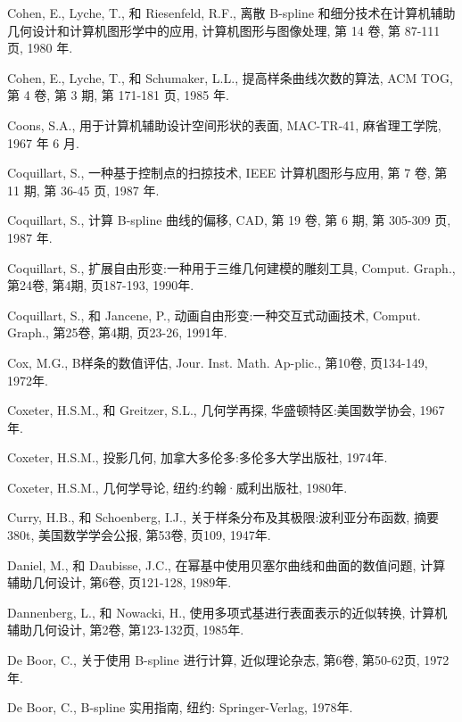 \documentclass[../main.tex]{subfiles}
\begin{document}
\begin{BookBibliography}
 Cohen, E., Lyche, T., 和 Riesenfeld, R.F., 离散 B-spline 和细分技术在计算机辅助几何设计和计算机图形学中的应用, 计算机图形与图像处理, 第 14 卷, 第 87-111 页, 1980 年.

 Cohen, E., Lyche, T., 和 Schumaker, L.L., 提高样条曲线次数的算法, ACM TOG, 第 4 卷, 第 3 期, 第 171-181 页, 1985 年.

 Coons, S.A., 用于计算机辅助设计空间形状的表面, MAC-TR-41, 麻省理工学院, 1967 年 6 月.

 Coquillart, S., 一种基于控制点的扫掠技术, IEEE 计算机图形与应用, 第 7 卷, 第 11 期, 第 36-45 页, 1987 年.

 Coquillart, S., 计算 B-spline 曲线的偏移, CAD, 第 19 卷, 第 6 期, 第 305-309 页, 1987 年.

 Coquillart, S., 扩展自由形变:一种用于三维几何建模的雕刻工具, Comput. Graph., 第24卷, 第4期, 页187-193, 1990年.

 Coquillart, S., 和 Jancene, P., 动画自由形变:一种交互式动画技术, Comput. Graph., 第25卷, 第4期, 页23-26, 1991年.

 Cox, M.G., B样条的数值评估, Jour. Inst. Math. Ap-plic., 第10卷, 页134-149, 1972年.

 Coxeter, H.S.M., 和 Greitzer, S.L., 几何学再探, 华盛顿特区:美国数学协会, 1967年.

 Coxeter, H.S.M., 投影几何, 加拿大多伦多:多伦多大学出版社, 1974年.

 Coxeter, H.S.M., 几何学导论, 纽约:约翰·威利出版社, 1980年.

 Curry, H.B., 和 Schoenberg, I.J., 关于样条分布及其极限:波利亚分布函数, 摘要380t, 美国数学学会公报, 第53卷, 页109, 1947年.

 Daniel, M., 和 Daubisse, J.C., 在幂基中使用贝塞尔曲线和曲面的数值问题, 计算辅助几何设计, 第6卷, 页121-128, 1989年.

 Dannenberg, L., 和 Nowacki, H., 使用多项式基进行表面表示的近似转换, 计算机辅助几何设计, 第2卷, 第123-132页, 1985年.

 De Boor, C., 关于使用 B-spline 进行计算, 近似理论杂志, 第6卷, 第50-62页, 1972年.

 De Boor, C., B-spline 实用指南, 纽约: Springer-Verlag, 1978年.


\end{BookBibliography}
\end{document}
